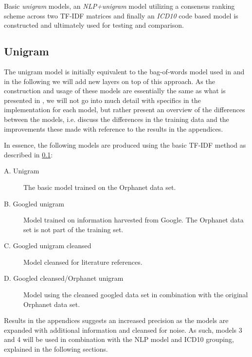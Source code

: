 \documentclass[10pt,letterpaper,final]{article}
\begin{document}
Basic \textit{unigram} models, an \textit{NLP+unigram} model utilizing a
consensus ranking scheme across two TF-IDF matrices and finally an
\textit{ICD10} code based model is constructed and ultimately used for
testing and comparison.


\subsection{Unigram}
\label{chap:unigrammethod}
The unigram model is initially equivalent to the bag-of-words model used in
\cite{jensenandersen} and in the following we will add new layers on top of this
approach. As the construction and usage of these models are essentially
the same as what is presented in \cite{jensenandersen}, we will not go
into much detail with specifics in the implementation for each model,
but rather present an overview of the differences between the models,
i.e. discuss the differences in the training data and the improvements
these made with reference to the results in the appendices.

In essence, the following models are produced using the basic TF-IDF
method as described in \ref{chap:unigrammethod}:

\begin{description}
\item[A. Unigram] The basic model trained on the Orphanet data set.
\item[B. Googled unigram] Model trained on information harvested from
Google. The Orphanet data set is not part of the training set.
\item[C. Googled unigram cleansed] Model cleansed for literature
references.
\item[D. Googled cleansed/Orphanet unigram] Model using the cleansed
googled data set in combination with the original Orphanet data set.
\end{description}

Results in the appendices suggests an increased precision as the models
are expanded with additional information and cleansed for noise. As such, models 3
and 4 will be used in combination with the NLP model and ICD10 grouping,
explained in the following sections.
\end{document}
